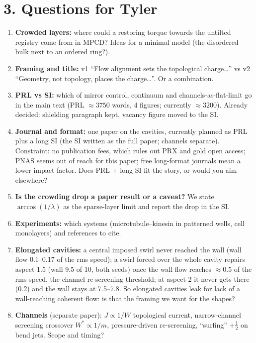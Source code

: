 \documentclass[10pt,a4paper]{article}
\newcommand{\half}{\tfrac12}\newcommand{\la}{\ell_a}\newcommand{\kT}{k_BT}
\begin{document}
\section*{3. Questions for Tyler}
\begin{enumerate}
\item \textbf{Crowded layers:} where could a restoring torque towards the untilted registry come from in MPCD? Ideas for a minimal model (the disordered bulk next to an ordered ring?).
\item \textbf{Framing and title:} v1 ``Flow alignment sets the topological charge\ldots'' vs v2 ``Geometry, not topology, places the charge\ldots''. Or a combination.
\item \textbf{PRL vs SI:} which of mirror control, continuum and channels-as-flat-limit go in the main text (PRL $\approx3750$ words, 4 figures; currently $\approx3200$). Already decided: shielding paragraph kept, vacancy figure moved to the SI.
\item \textbf{Journal and format:} one paper on the cavities, currently planned as PRL plus a long SI (the SI written as the full paper; channels separate). Constraint: no publication
fees, which rules out PRX and gold open access; PNAS seems out of reach for this paper; free long-format journals mean a lower impact factor. Does PRL + long SI fit the story, or would you
aim elsewhere?
\item \textbf{Is the crowding drop a paper result or a caveat?} We state $\arccos(1/\lambda)$ as the sparse-layer limit and report the drop in the SI.
\item \textbf{Experiments:} which systems (microtubule--kinesin in patterned wells, cell monolayers) and references to cite.
\item \textbf{Elongated cavities:} a central imposed swirl never reached the wall (wall flow 0.1--0.17 of the rms speed); a swirl forced over the whole cavity repairs aspect 1.5 (wall 9.5 of 10, both seeds) once the wall flow reaches $\approx0.5$ of the rms speed, the channel re-screening threshold; at aspect 2 it never gets there (0.2) and the wall stays at 7.5--7.8. So elongated cavities leak for lack of a wall-reaching coherent flow: is that the framing we want for the shapes?
\item \textbf{Channels} (separate paper): $J\propto1/W$ topological current, narrow-channel screening crossover $W^*\propto1/m$, pressure-driven re-screening, ``surfing'' $+\half$ on bend jets. Scope and timing?
\end{enumerate}
\end{document}
